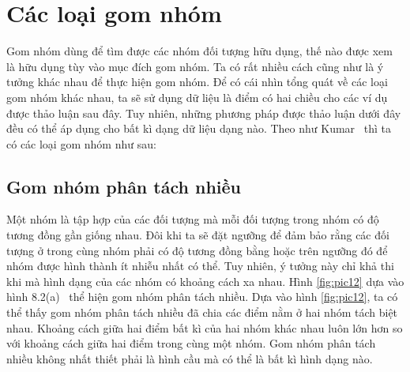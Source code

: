 \section{Các loại gom nhóm}
\label{sec:clgn}
Gom nhóm dùng để tìm được các nhóm đối tượng hữu dụng, thế nào được xem là hữu dụng tùy vào mục đích gom nhóm.
Ta có rất nhiều cách cũng như là ý tưởng khác nhau để thực hiện gom nhóm.
Để có cái nhìn tổng quát về các loại gom nhóm khác nhau, ta sẽ sử dụng dữ liệu là điểm có hai chiều cho các ví dụ được thảo luận sau đây.
Tuy nhiên, những phương pháp được thảo luận dưới đây đều có thể áp dụng cho bất kì dạng dữ liệu dạng nào.
Theo như Kumar~\cite{Vipin-Kumar} thì ta có các loại gom nhóm như sau:

\subsection{Gom nhóm phân tách nhiều}
Một nhóm là tập hợp của các đối tượng mà mỗi đối tượng trong nhóm có độ tương đồng gần giống nhau.
Đôi khi ta sẽ đặt ngưỡng để đảm bảo rằng các đối tượng ở trong cùng nhóm phải có độ tương đồng bằng hoặc trên ngưỡng đó để nhóm được hình thành ít nhiễu nhất có thể.
Tuy nhiên, ý tưởng này chỉ khả thi khi mà hình dạng của các nhóm có khoảng cách xa nhau.
Hình \ref{fig:pic12} dựa vào hình 8.2(a)~\cite{Vipin-Kumar} thể hiện gom nhóm phân tách nhiều.
Dựa vào hình \ref{fig:pic12}, ta có thể thấy gom nhóm phân tách nhiều đã chia các điểm nằm ở hai nhóm tách biệt nhau.
Khoảng cách giữa hai điểm bất kì của hai nhóm khác nhau luôn lớn hơn so với khoảng cách giữa hai điểm trong cùng một nhóm.
Gom nhóm phân tách nhiều không nhất thiết phải là hình cầu mà có thể là bất kì hình dạng nào.

